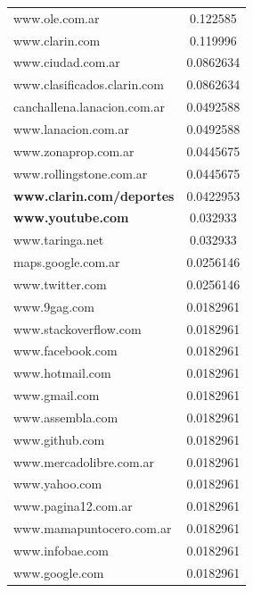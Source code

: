 \begin{table}
\begin{center}
{\begin{tabular}{ l | c }
  \hline
www.ole.com.ar & 0.122585 \\
www.clarin.com & 0.119996 \\
www.ciudad.com.ar & 0.0862634 \\
www.clasificados.clarin.com & 0.0862634 \\
canchallena.lanacion.com.ar & 0.0492588 \\
www.lanacion.com.ar & 0.0492588 \\
www.zonaprop.com.ar & 0.0445675 \\
www.rollingstone.com.ar & 0.0445675 \\
\textbf{www.clarin.com/deportes} & 0.0422953 \\
\textbf{www.youtube.com} & 0.032933 \\
www.taringa.net & 0.032933 \\
maps.google.com.ar & 0.0256146 \\
www.twitter.com & 0.0256146 \\
www.9gag.com & 0.0182961 \\
www.stackoverflow.com & 0.0182961 \\
www.facebook.com & 0.0182961 \\
www.hotmail.com & 0.0182961 \\
www.gmail.com & 0.0182961 \\
www.assembla.com & 0.0182961 \\
www.github.com & 0.0182961 \\
www.mercadolibre.com.ar & 0.0182961 \\
www.yahoo.com & 0.0182961 \\
www.pagina12.com.ar & 0.0182961 \\
www.mamapuntocero.com.ar & 0.0182961 \\
www.infobae.com & 0.0182961 \\
www.google.com & 0.0182961 \\
  \hline
\end{tabular}
}
\qquad
{}
\end{center}
\end{table}
